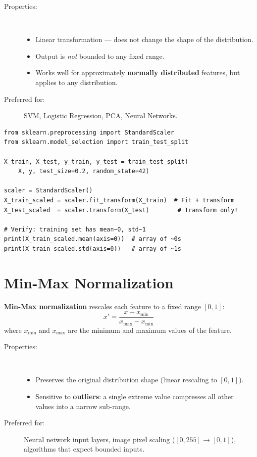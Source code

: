\begin{description}
    \item[Properties:]~
    \begin{itemize}
        \item Linear transformation --- does not change the shape of the distribution.
        \item Output is \textit{not} bounded to any fixed range.
        \item Works well for approximately \textbf{normally distributed} features, but applies to any distribution.
    \end{itemize}
    \item[Preferred for:] SVM, Logistic Regression, PCA, Neural Networks.
\end{description}

\begin{lstlisting}[style=pythonstyle]
from sklearn.preprocessing import StandardScaler
from sklearn.model_selection import train_test_split

X_train, X_test, y_train, y_test = train_test_split(
    X, y, test_size=0.2, random_state=42)

scaler = StandardScaler()
X_train_scaled = scaler.fit_transform(X_train)  # Fit + transform
X_test_scaled  = scaler.transform(X_test)        # Transform only!

# Verify: training set has mean~0, std~1
print(X_train_scaled.mean(axis=0))  # array of ~0s
print(X_train_scaled.std(axis=0))   # array of ~1s
\end{lstlisting}

\section*{Min-Max Normalization}

\begin{definition}
\textbf{Min-Max normalization} rescales each feature to a fixed range $[0, 1]$:
$$x' = \frac{x - x_{\min}}{x_{\max} - x_{\min}}$$
where $x_{\min}$ and $x_{\max}$ are the minimum and maximum values of the feature.
\end{definition}

\begin{description}
    \item[Properties:]~
    \begin{itemize}
        \item Preserves the original distribution shape (linear rescaling to $[0,1]$).
        \item Sensitive to \textbf{outliers}: a single extreme value compresses all other values into a narrow sub-range.
    \end{itemize}
    \item[Preferred for:] Neural network input layers, image pixel scaling ($[0,255] \to [0,1]$), algorithms that expect bounded inputs.
\end{description}

